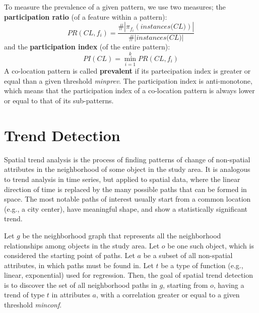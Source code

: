 To measure the prevalence of a given pattern, we use two measures; the \textbf{participation ratio} (of a feature within a pattern):
\begin{equation*}
    PR(CL, f_i) = \frac{\#|\pi_{f_i} (\textit{instances(CL)})|}{\#|\textit{instances(CL)}|}
\end{equation*}
and the \textbf{participation index} (of the entire pattern):
\begin{equation*}
    PI(CL) = \min_{i=1}^k PR(CL, f_i)
\end{equation*}
A co-location pattern is called \textbf{prevalent} if its partecipation index is greater or equal than a given threshold \textit{minprev}. The participation index is anti-monotone, which means that the participation index of a co-location pattern is always lower or equal to that of its sub-patterns.

\section{Trend Detection}

Spatial trend analysis is the process of finding patterns of change of non-spatial attributes in the neighborhood of some object in the study area. It is analogous to trend analysis in time series, but applied to spatial data, where the linear direction of time is replaced by the many possible paths that can be formed in space. The most notable paths of interest usually start from a common location (e.g., a city center), have meaningful shape, and show a statistically significant trend.

Let $g$ be the neighborhood graph that represents all the neighborhood relationships among objects in the study area. Let $o$ be one such object, which is considered the starting point of paths. Let $a$ be a subset of all non-spatial attributes, in which paths must be found in. Let $t$ be a type of function (e.g., linear, exponential) used for regression. Then, the goal of spatial trend detection is to discover the set of all neighborhood paths in $g$, starting from $o$, having a trend of type $t$ in attributes $a$, with a correlation greater or equal to a given threshold \textit{minconf}.

